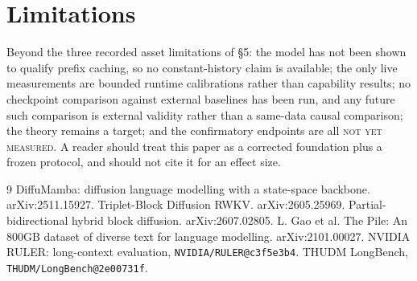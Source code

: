 \documentclass[11pt]{article}
\newcommand{\notrun}{\textsc{not yet measured}}
\begin{document}
\section{Limitations}
\label{sec:limitations}

Beyond the three recorded asset limitations of \S5: the model has not been shown to
qualify prefix caching, so no constant-history claim is available; the only live
measurements are bounded runtime calibrations rather than capability results; no
checkpoint comparison against external baselines has been run, and any future such
comparison is external validity rather than a same-data causal comparison; the theory
remains a target; and the confirmatory endpoints are all \notrun. A reader should treat
this paper as a corrected foundation plus a frozen protocol, and should not cite it for
an effect size.

\begin{thebibliography}{9}
 DiffuMamba: diffusion language modelling with a state-space
backbone. arXiv:2511.15927.
 Triplet-Block Diffusion RWKV. arXiv:2605.25969.
 Partial-bidirectional hybrid block diffusion. arXiv:2607.02805.
 L. Gao et al. The Pile: An 800GB dataset of diverse text for language
modelling. arXiv:2101.00027.
 NVIDIA RULER: long-context evaluation, \texttt{NVIDIA/RULER@c3f5e3b4}.
 THUDM LongBench, \texttt{THUDM/LongBench@2e00731f}.
\end{thebibliography}
\end{document}
